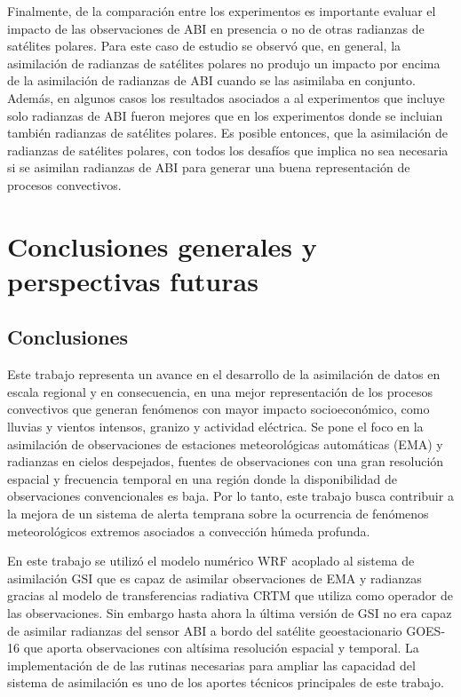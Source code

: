 \documentclass[12pt,oneside,a4paper]{reedthesis}
\begin{document}
Finalmente, de la comparación entre los experimentos es importante evaluar el impacto de las observaciones de ABI en presencia o no de otras radianzas de satélites polares. Para este caso de estudio se observó que, en general, la asimilación de radianzas de satélites polares no produjo un impacto por encima de la asimilación de radianzas de ABI cuando se las asimilaba en conjunto. Además, en algunos casos los resultados asociados a al experimentos que incluye solo radianzas de ABI fueron mejores que en los experimentos donde se incluian también radianzas de satélites polares. Es posible entonces, que la asimilación de radianzas de satélites polares, con todos los desafíos que implica no sea necesaria si se asimilan radianzas de ABI para generar una buena representación de procesos convectivos.

\hypertarget{conclusiones-generales-y-perspectivas-futuras}{%
\chapter{Conclusiones generales y perspectivas futuras}\label{conclusiones-generales-y-perspectivas-futuras}}

\hypertarget{conclusiones-3}{%
\section{Conclusiones}\label{conclusiones-3}}

Este trabajo representa un avance en el desarrollo de la asimilación de datos en escala regional y en consecuencia, en una mejor representación de los procesos convectivos que generan fenómenos con mayor impacto socioeconómico, como lluvias y vientos intensos, granizo y actividad eléctrica. Se pone el foco en la asimilación de observaciones de estaciones meteorológicas automáticas (EMA) y radianzas en cielos despejados, fuentes de observaciones con una gran resolución espacial y frecuencia temporal en una región donde la disponibilidad de observaciones convencionales es baja. Por lo tanto, este trabajo busca contribuir a la mejora de un sistema de alerta temprana sobre la ocurrencia de fenómenos meteorológicos extremos asociados a convección húmeda profunda.

En este trabajo se utilizó el modelo numérico WRF acoplado al sistema de asimilación GSI que es capaz de asimilar observaciones de EMA y radianzas gracias al modelo de transferencias radiativa CRTM que utiliza como operador de las observaciones. Sin embargo hasta ahora la última versión de GSI no era capaz de asimilar radianzas del sensor ABI a bordo del satélite geoestacionario GOES-16 que aporta observaciones con altísima resolución espacial y temporal. La implementación de de las rutinas necesarias para ampliar las capacidad del sistema de asimilación es uno de los aportes técnicos principales de este trabajo.
\end{document}
